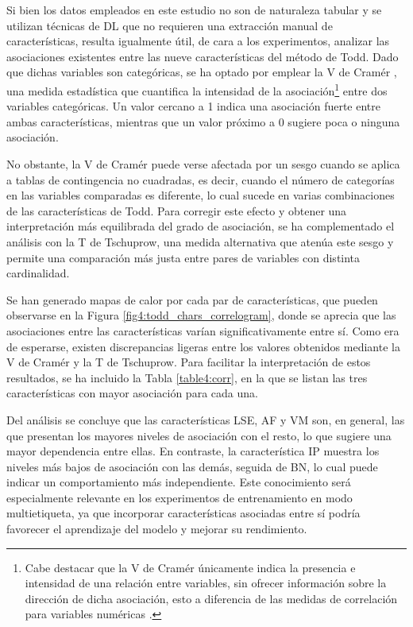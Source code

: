 Si bien los datos empleados en este estudio no son de naturaleza tabular y se utilizan técnicas de DL que no requieren una extracción manual de características, resulta igualmente útil, de cara a los experimentos, analizar las asociaciones existentes entre las nueve características del método de Todd. Dado que dichas variables son categóricas, se ha optado por emplear la V de Cramér \cite{sheskin_handbook_2020}, una medida estadística que cuantifica la intensidad de la asociación\footnote{Cabe destacar que la V de Cramér únicamente indica la presencia e intensidad de una relación entre variables, sin ofrecer información sobre la dirección de dicha asociación, esto a diferencia de las medidas de correlación para variables numéricas \cite{jimenez_nota_2024}.} entre dos variables categóricas. Un valor cercano a 1 indica una asociación fuerte entre ambas características, mientras que un valor próximo a 0 sugiere poca o ninguna asociación.

No obstante, la V de Cramér puede verse afectada por un sesgo cuando se aplica a tablas de contingencia no cuadradas, es decir, cuando el número de categorías en las variables comparadas es diferente, lo cual sucede en varias combinaciones de las características de Todd. Para corregir este efecto y obtener una interpretación más equilibrada del grado de asociación, se ha complementado el análisis con la T de Tschuprow, una medida alternativa que atenúa este sesgo y permite una comparación más justa entre pares de variables con distinta cardinalidad.

Se han generado mapas de calor por cada par de características, que pueden observarse en la Figura \ref{fig4:todd_chars_correlogram}, donde se aprecia que las asociaciones entre las características varían significativamente entre sí. Como era de esperarse, existen discrepancias ligeras entre los valores obtenidos mediante la V de Cramér y la T de Tschuprow. Para facilitar la interpretación de estos resultados, se ha incluido la Tabla \ref{table4:corr}, en la que se listan las tres características con mayor asociación para cada una.

Del análisis se concluye que las características LSE, AF y VM son, en general, las que presentan los mayores niveles de asociación con el resto, lo que sugiere una mayor dependencia entre ellas. En contraste, la característica IP muestra los niveles más bajos de asociación con las demás, seguida de BN, lo cual puede indicar un comportamiento más independiente. Este conocimiento será especialmente relevante en los experimentos de entrenamiento en modo multietiqueta, ya que incorporar características asociadas entre sí podría favorecer el aprendizaje del modelo y mejorar su rendimiento.

